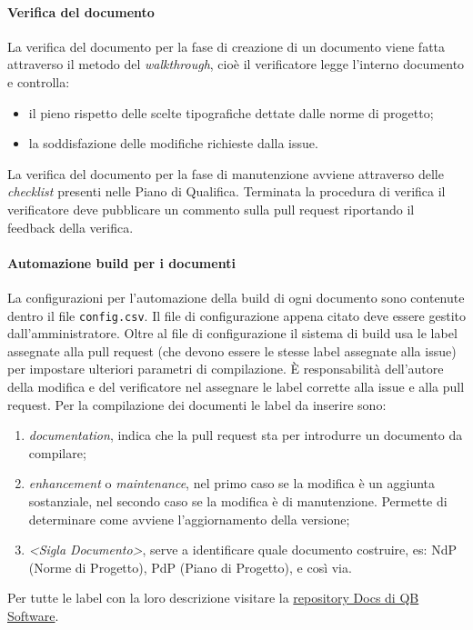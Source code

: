         \paragraph{Verifica del documento} \label{sec:doc_verification}
            La verifica del documento per la fase di creazione di un documento viene fatta attraverso il metodo del \emph{walkthrough}, cioè il verificatore legge l'interno documento e controlla:
                \begin{itemize}
                    \item il pieno rispetto delle scelte tipografiche dettate dalle norme di progetto;
                    \item la soddisfazione delle modifiche richieste dalla issue.
                \end{itemize}
            La verifica del documento per la fase di manutenzione avviene attraverso delle \emph{checklist} presenti nelle Piano di Qualifica. Terminata la procedura di verifica il verificatore deve pubblicare un commento sulla pull request riportando il feedback della verifica.
            
		\paragraph{Automazione build per i documenti} \label{sec:doc_CM}
		    La configurazioni per l'automazione della build di ogni documento sono contenute dentro il file \verb|config.csv|. Il file di configurazione appena citato deve essere gestito dall'amministratore.
		    Oltre al file di configurazione il sistema di build usa le label assegnate alla pull request (che devono essere le stesse label assegnate alla issue) per impostare ulteriori parametri di compilazione.
		    È responsabilità dell'autore della modifica e del verificatore nel assegnare le label corrette alla issue e alla pull request. Per la compilazione dei documenti le label da inserire sono:
		    \begin{enumerate}
		    	\item \emph{documentation}, indica che la pull request sta per introdurre un documento da compilare;
		    	\item \emph{enhancement} o \emph{maintenance}, nel primo caso se la modifica è un aggiunta sostanziale, nel secondo caso se la modifica è di manutenzione. Permette di determinare come avviene l'aggiornamento della versione;
		    	\item \emph{<Sigla Documento>}, serve a identificare quale documento costruire, es: NdP (Norme di Progetto), PdP (Piano di Progetto), e così via.
		    \end{enumerate}
		    Per tutte le label con la loro descrizione visitare la \href{https://github.com/QB-Software-swe/docs/labels}{repository Docs di QB Software}.
            
